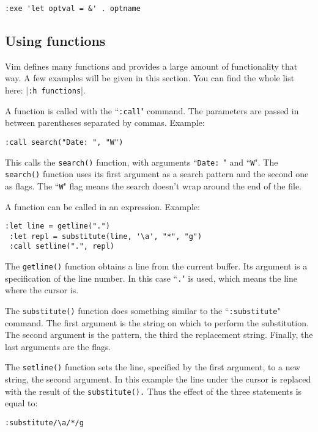 \begin{Verbatim}[samepage=true]
 :exe 'let optval = &' . optname
\end{Verbatim}

\subsection{Using functions}
Vim defines many functions and provides a large amount of functionality that way.
A few examples will be given in this section.
You can find the whole list here: |\texttt{:h functions}|.

A function is called with the ``\texttt{:call}" command.
The parameters are passed in between parentheses separated by commas.
Example:

\begin{Verbatim}[samepage=true]
 :call search("Date: ", "W")
\end{Verbatim}

This calls the \texttt{search()} function, with arguments ``\texttt{Date: }" and ``\texttt{W}".
The \texttt{search()} function uses its first argument as a search pattern and the second one as flags.
The ``\texttt{W}" flag means the search doesn't wrap around the end of the file.

A function can be called in an expression.
Example:

\begin{Verbatim}[samepage=true]
 :let line = getline(".")
 :let repl = substitute(line, '\a', "*", "g")
 :call setline(".", repl)
\end{Verbatim}

The \texttt{getline()} function obtains a line from the current buffer.
Its argument is a specification of the line number.
In this case ``\texttt{.}" is used, which means the line where the cursor is.

The \texttt{substitute()} function does something similar to the ``\texttt{:substitute}" command.
The first argument is the string on which to perform the substitution.
The second argument is the pattern, the third the replacement string.
Finally, the last arguments are the flags.

The \texttt{setline()} function sets the line, specified by the first argument, to a new string, the second argument.
In this example the line under the cursor is replaced with the result of the \texttt{substitute().}  Thus the effect of the three statements is equal to:

\begin{Verbatim}[samepage=true]
 :substitute/\a/*/g
\end{Verbatim}

